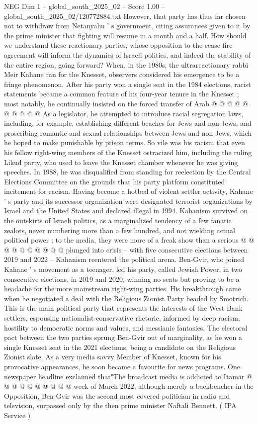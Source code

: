 \begin{textsample}{NEG Dim 1 – global\_south\_2025\_02 – Score 1.00 – global\_south\_2025\_02/120772884.txt}
However, that party has thus far chosen not to withdraw from Netanyahu ' s government, citing assurances given to it by the prime minister that fighting will resume in a month and a half.
How should we understand these reactionary parties, whose opposition to the cease-fire agreement will inform the dynamics of Israeli politics, and indeed the stability of the entire region, going forward?
When, in the 1980s, the ultrareactionary rabbi Meir Kahane ran for the Knesset, observers considered his emergence to be a fringe phenomenon.
After his party won a single seat in the 1984 elections, racist statements became a common feature of his four-year tenure in the Knesset ; most notably, he continually insisted on the forced transfer of Arab @ @ @ @ @ @ @ @ @ @ As a legislator, he attempted to introduce racial segregation laws, including, for example, establishing different beaches for Jews and non-Jews, and proscribing romantic and sexual relationships between Jews and non-Jews, which he hoped to make punishable by prison terms.
So vile was his racism that even his fellow right-wing members of the Knesset ostracized him, including the ruling Likud party, who used to leave the Knesset chamber whenever he was giving speeches.
In 1988, he was disqualified from standing for reelection by the Central Elections Committee on the grounds that his party platform constituted incitement for racism.
Having become a hotbed of violent settler activity, Kahane ' s party and its successor organization were designated terrorist organizations by Israel and the United States and declared illegal in 1994.
Kahanism survived on the outskirts of Israeli politics, as a marginalized tendency of a few fanatic zealots, never numbering more than a few hundred, and not wielding actual political power ; to the media, they were more of a freak show than a serious @ @ @ @ @ @ @ @ @ @ plunged into crisis -- with five consecutive elections between 2019 and 2022 -- Kahanism reentered the political arena.
Ben-Gvir, who joined Kahane ' s movement as a teenager, led his party, called Jewish Power, in two consecutive elections, in 2019 and 2020, winning no seats but proving to be a headache for the more mainstream right-wing parties.
His breakthrough came when he negotiated a deal with the Religious Zionist Party headed by Smotrich.
This is the main political party that represents the interests of the West Bank settlers, espousing nationalist-conservative rhetoric, informed by deep racism, hostility to democratic norms and values, and messianic fantasies.
The electoral pact between the two parties sprung Ben-Gvir out of marginality, as he won a single Knesset seat in the 2021 elections, being a candidate on the Religious Zionist slate.
As a very media savvy Member of Knesset, known for his provocative appearances, he soon became a favourite for news programs.
One newspaper headline exclaimed that"The broadcast media is addicted to Itamar @ @ @ @ @ @ @ @ @ @ week of March 2022, although merely a backbencher in the Opposition, Ben-Gvir was the second most covered politician in radio and television, surpassed only by the then prime minister Naftali Bennett. ( IPA Service )

\end{textsample}
